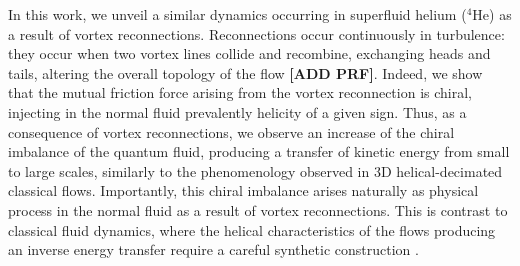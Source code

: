 \documentclass[%
 reprint,
 amsmath,amssymb,
 aps,
 prl,
]{revtex4-2}
\newcommand*{\NOTE}[1]{\textbf{\color{red}[#1]}}
\begin{document}
{In this work, we unveil a similar dynamics occurring in superfluid helium
($^4$He) as a result of vortex reconnections.  
Reconnections occur continuously in turbulence: they occur when
two vortex lines collide and recombine, exchanging heads and tails, 
altering the overall topology of the flow
\cite{koplik-levine-1993,bewley-etal-2008,rorai-etal-2016,serafini-etal-2017,galantucci-baggaley-parker-barenghi-2019,villois2020irreversible}\NOTE{ADD PRF}. 
Indeed, we show that the mutual friction force arising from the  
vortex reconnection is chiral, injecting in the normal fluid prevalently 
helicity of a given sign. 
Thus, as a consequence of vortex reconnections,
we observe an increase of the chiral imbalance of 
the quantum fluid, producing a transfer of
kinetic energy from small to large scales, similarly to the 
phenomenology observed in 3D helical-decimated classical flows. 
Importantly, this chiral imbalance arises naturally as physical process in the normal fluid as a result of vortex reconnections. This is contrast to classical fluid dynamics, 
where the helical characteristics of the flows producing 
an inverse energy transfer require a careful synthetic construction 
\cite{biferaleInverseEnergyCascade2012a,biferale-etal-2013,sahoo-etal-2017,plunianInverseCascadeEnergy2020a}.

%



}
\end{document}
